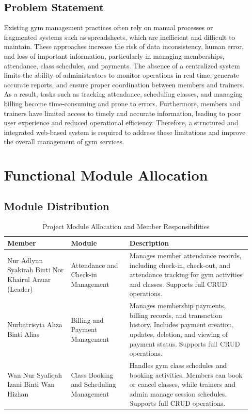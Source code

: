 \documentclass[12pt, a4paper]{article}
\begin{document}
\subsection{Problem Statement}
Existing gym management practices often rely on manual processes or fragmented systems such as spreadsheets, which are inefficient and difficult to maintain. 
These approaches increase the risk of data inconsistency, human error, and loss of important information, particularly in managing memberships, attendance, class schedules, and payments. 
The absence of a centralized system limits the ability of administrators to monitor operations in real time, generate accurate reports, and ensure proper coordination between members and trainers. 
As a result, tasks such as tracking attendance, scheduling classes, and managing billing become time-consuming and prone to errors. 
Furthermore, members and trainers have limited access to timely and accurate information, leading to poor user experience and reduced operational efficiency.
Therefore, a structured and integrated web-based system is required to address these limitations and improve the overall management of gym services.

\section{Functional Module Allocation}

\subsection{Module Distribution}

\begin{table}[h!]
    \centering
    \caption{Project Module Allocation and Member Responsibilities}
    \renewcommand{\arraystretch}{1.2}
    \begin{tabularx}{\textwidth}{|p{5cm}|p{4cm}|X|}
        \hline
        \textbf{Member} & \textbf{Module} & \textbf{Description} \\ \hline
        Nur Adlynn Syakirah Binti Nor Khairul Anuar (Leader) 
        & Attendance and Check-in Management 
        & Manages member attendance records, including check-in, check-out, and attendance tracking for gym activities and classes. Supports full CRUD operations. \\ \hline
        
        Nurbatrisyia Aliza Binti Alias 
        & Billing and Payment Management 
        & Manages membership payments, billing records, and transaction history. Includes payment creation, updates, deletion, and viewing of payment status. Supports full CRUD operations. \\ \hline
        
        Wan Nur Syafiqah Izani Binti Wan Hizhan 
        & Class Booking and Scheduling Management 
        & Handles gym class schedules and booking activities. Members can book or cancel classes, while trainers and admin manage session schedules. Supports full CRUD operations. \\ \hline
    \end{tabularx}
\end{table}
\end{document}
